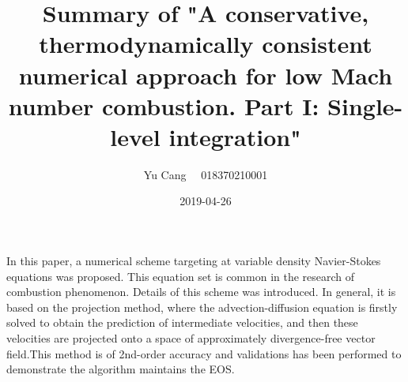 \documentclass[paper=a4, fontsize=11pt]{scrartcl}
\title{Summary of "A conservative, thermodynamically consistent numerical approach for
	low Mach number combustion. Part I: Single-level integration"}
\author{Yu Cang \ \ 018370210001}
\date{2019-04-26}
\begin{document}
\maketitle
	In this paper, a numerical scheme targeting at variable density Navier-Stokes equations was proposed. This equation set is common in the research of combustion phenomenon. Details of this scheme was introduced. In general, it is based on the projection method, where the advection-diffusion equation is firstly solved to obtain the prediction of intermediate velocities, and then these velocities are projected onto a space of approximately divergence-free vector field.This method is of 2nd-order accuracy and validations has been performed to demonstrate the algorithm maintains the EOS.
	
\end{document}
